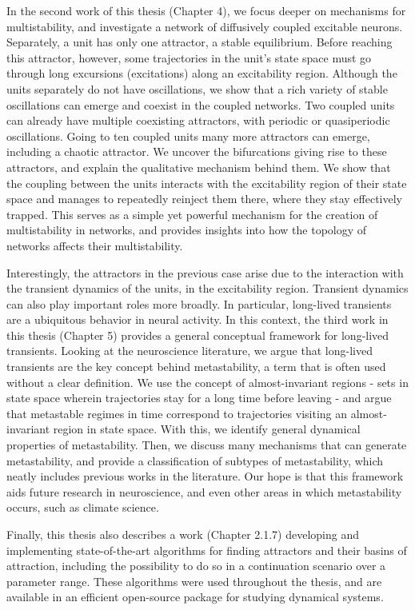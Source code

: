 In the second work of this thesis (Chapter 4), we focus deeper on mechanisms for multistability, and investigate a network of diffusively coupled excitable neurons. Separately, a unit has only one attractor, a stable equilibrium. Before reaching this attractor, however, some trajectories in the unit's state space must go through long excursions (excitations) along an excitability region. Although the units separately do not have oscillations, we show that a rich variety of stable oscillations can emerge and coexist in the coupled networks. Two coupled units can already have multiple coexisting attractors, with periodic or quasiperiodic oscillations. Going to ten coupled units many more attractors can emerge, including a chaotic attractor. We uncover the bifurcations giving rise to these attractors, and explain the qualitative mechanism behind them. We show that the coupling between the units interacts with the excitability region of their state space and manages to repeatedly reinject them there, where they stay effectively trapped. This serves as a simple yet powerful mechanism for the creation of multistability in networks, and provides insights into how the topology of networks affects their multistability. 

Interestingly, the attractors in the previous case arise due to the interaction with the transient dynamics of the units, in the excitability region. Transient dynamics can also play important roles more broadly. In particular, long-lived transients are a ubiquitous behavior in neural activity. In this context, the third work in this thesis (Chapter 5) provides a general conceptual framework for long-lived transients. Looking at the neuroscience literature, we argue that long-lived transients are the key concept behind metastability, a term that is often used without a clear definition. We use the concept of almost-invariant regions - sets in state space wherein trajectories stay for a long time before leaving - and argue that metastable regimes in time correspond to trajectories visiting an almost-invariant region in state space. With this, we identify general dynamical properties of metastability. Then, we discuss many mechanisms that can generate metastability, and provide a classification of subtypes of metastability, which neatly includes previous works in the literature. Our hope is that this framework aids future research in neuroscience, and even other areas in which metastability occurs, such as climate science.

Finally, this thesis also describes a work (Chapter 2.1.7) developing and implementing state-of-the-art algorithms for finding attractors and their basins of attraction, including the possibility to do so in a continuation scenario over a parameter range. These algorithms were used throughout the thesis, and are available in an efficient open-source package for studying dynamical systems. 






